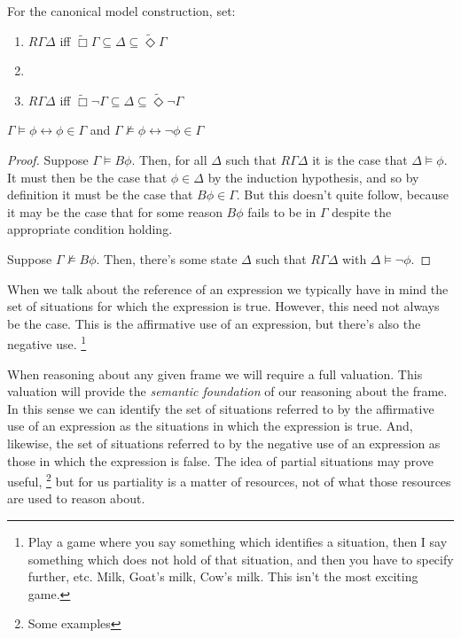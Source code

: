 \documentclass[10pt]{article}
\begin{document}
For the canonical model construction, set:
\begin{enumerate}
\item \(R\Gamma\Delta\) iff \(\widetilde{\Box}\Gamma \subseteq \Delta \subseteq \widetilde{\Diamond}\Gamma\)
\item \item \(R\Gamma\Delta\) iff \(\widetilde{\Box}\lnot\Gamma \subseteq \Delta \subseteq \widetilde{\Diamond}\lnot\Gamma\)
\end{enumerate}

\begin{lemma}

  \(\Gamma \vDash \phi \leftrightarrow \phi \in \Gamma\) and \(\Gamma \nvDash \phi \leftrightarrow \lnot\phi \in \Gamma\)

  \begin{proof}
    Suppose \(\Gamma \vDash B\phi\).
    Then, for all \(\Delta\) such that \(R\Gamma\Delta\) it is the case that \(\Delta \vDash \phi\).
    It must then be the case that \(\phi \in \Delta\) by the induction hypothesis, and so by definition it must be the case that \(B\phi \in \Gamma\).
    But this doesn't quite follow, because it may be the case that for some reason \(B\phi\) fails to be in \(\Gamma\) despite the appropriate condition holding.
    

    Suppose \(\Gamma \nvDash B\phi\).
    Then, there's some state \(\Delta\) such that \(R\Gamma\Delta\) with \(\Delta \vDash \lnot\phi\).
    
    

  \end{proof}
\end{lemma}


\newpage

\hfill
\printbibliography

\newpage

When we talk about the reference of an expression we typically have in mind the set of situations for which the expression is true.
However, this need not always be the case.
This is the affirmative use of an expression, but there's also the negative use.\nolinebreak
\footnote{Play a game where you say something which identifies a situation, then I say something which does not hold of that situation, and then you have to specify further, etc.
  Milk, Goat's milk, Cow's milk.
  This isn't the most exciting game.}


When reasoning about any given frame we will require a full valuation.
This valuation will provide the \emph{semantic foundation} of our reasoning about the frame.
In this sense we can identify the set of situations referred to by the affirmative use of an expression as the situations in which the expression is true.
And, likewise, the set of situations referred to by the negative use of an expression as those in which the expression is false.
The idea of partial situations may prove useful,\nolinebreak
\footnote{Some examples}
but for us partiality is a matter of resources, not of what those resources are used to reason about.
\end{document}
